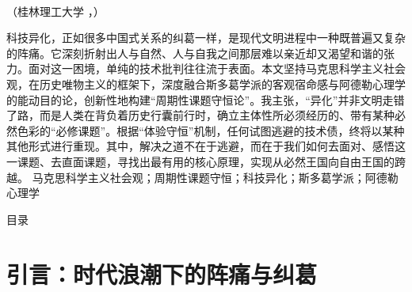 \documentclass[a4paper,12pt]{ctexart}
\begin{document}
\makeCoverPage

\begin{center}
    {\heiti \getPaperTitleLineA \getPaperTitleLineB}
\end{center}

\begin{center}
    \vspace{-0.5em}
    \setlength{\baselineskip}{23pt} 
    {\kaishu \getStudentName} \\
    {\kaishu （桂林理工大学 \getStudentCollege，\getStudentLocation）}
\end{center}

\vspace{1em}

\begin{PaperAbstract}{
科技异化，正如很多中国式关系的纠葛一样，是现代文明进程中一种既普遍又复杂的阵痛。它深刻折射出人与自然、人与自我之间那层难以亲近却又渴望和谐的张力。面对这一困境，单纯的技术批判往往流于表面。本文坚持马克思科学主义社会观，在历史唯物主义的框架下，深度融合斯多葛学派的客观宿命感与阿德勒心理学的能动目的论，创新性地构建“周期性课题守恒论”。我主张，“异化”并非文明走错了路，而是人类在背负着历史行囊前行时，确立主体性所必须经历的、带有某种必然色彩的“必修课题”。根据“体验守恒”机制，任何试图逃避的技术债，终将以某种其他形式进行重现。其中，解决之道不在于逃避，而在于我们如何去面对、感悟这一课题、去直面课题，寻找出最有用的核心原理，实现从必然王国向自由王国的跨越。
}
马克思科学主义社会观；周期性课题守恒；科技异化；斯多葛学派；阿德勒心理学
\end{PaperAbstract}

\newpage
{} %
\begin{center}
    \heiti 目\quad 录
\end{center}
\vspace{1em}
\makeatletter
{}
\makeatother
\newpage
{} %

\songti
\setlength{\baselineskip}{23pt}
\setlength{\parindent}{2em} 

\section{引言：时代浪潮下的阵痛与纠葛}
\end{document}
